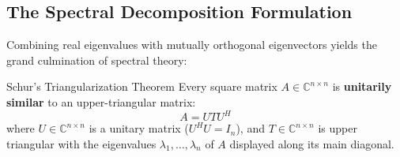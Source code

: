 \subsection{The Spectral Decomposition Formulation}

Combining real eigenvalues with mutually orthogonal eigenvectors yields the grand culmination of spectral theory:

\begin{theorembox}{Schur's Triangularization Theorem}
\label{thm:schur_triangularization}
Every square matrix $A \in \mathbb{C}^{n \times n}$ is \textbf{unitarily similar} to an upper-triangular matrix:
\begin{equation}
A = U T U^H
\label{eq:schur_decomposition}
\end{equation}
where $U \in \mathbb{C}^{n \times n}$ is a unitary matrix ($U^H U = I_n$), and $T \in \mathbb{C}^{n \times n}$ is upper triangular with the eigenvalues $\lambda_1, \dots, \lambda_n$ of $A$ displayed along its main diagonal.
\end{theorembox}

